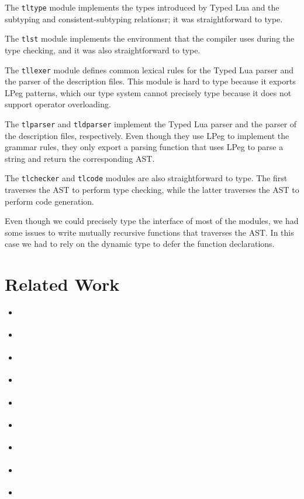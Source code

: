 The \texttt{tltype} module implements the types introduced by
Typed Lua and the subtyping and consistent-subtyping relationsr;
it was straightforward to type.

The \texttt{tlst} module implements the environment that the
compiler uses during the type checking, and it was also straightforward
to type.

The \texttt{tllexer} module defines common lexical rules for
the Typed Lua parser and the parser of the description files.
This module is hard to type because it exports LPeg \citep{lpeg,ierusalimschy2009lpeg}
patterns, which our type system cannot precisely type because it does
not support operator overloading.

The \texttt{tlparser} and \texttt{tldparser} implement the Typed Lua
parser and the parser of the description files, respectively.
Even though they use LPeg to implement the grammar rules,
they only export a parsing function that uses LPeg to parse a
string and return the corresponding AST.

The \texttt{tlchecker} and \texttt{tlcode} modules are also
straightforward to type.
The first traverses the AST to perform type checking,
while the latter traverses the AST to perform code generation.

Even though we could precisely type the interface of most of
the modules, we had some issues to write mutually recursive
functions that traverses the AST.
In this case we had to rely on the dynamic type to defer the
function declarations.

\section{Related Work}

\begin{itemize}
\item \citep{tidallock}
\item \citep{bonnaire-sergeant2012typed-clojure}
\item \citep{vitousek2014deg}
\item \citep{allende2013gts}
\item \citep{tobin-hochstadt2008ts} 
\item \citep{dart}
\item \citep{typescript}
\item \citep{bierman2014typescript}
\item \citep{politz2012semantics}
\end{itemize}
